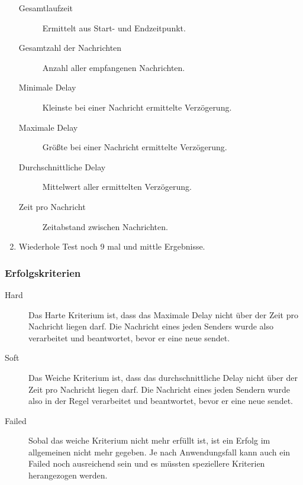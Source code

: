 \begin{enumerate}
  \begin{description}
  \item[Gesamtlaufzeit]
  Ermittelt aus Start- und Endzeitpunkt.
  
  \item[Gesamtzahl der Nachrichten]
  Anzahl aller empfangenen Nachrichten.
  
  \item[Minimale Delay]
  Kleinste bei einer Nachricht ermittelte Verzögerung.
  
  \item[Maximale Delay]
  Größte bei einer Nachricht ermittelte Verzögerung.
  
  \item[Durchschnittliche Delay]
  Mittelwert aller ermittelten Verzögerung.
  
  \item[Zeit pro Nachricht]
  Zeitabstand zwischen Nachrichten.
  \end{description}

\item
Wiederhole Test noch 9 mal und mittle Ergebnisse.
\end{enumerate}



\subsubsection{Erfolgskriterien}
\begin{description}
\item[Hard]
Das Harte Kriterium ist, dass das Maximale Delay nicht über der Zeit pro Nachricht liegen darf. Die Nachricht eines jeden Senders wurde also verarbeitet und beantwortet, bevor er eine neue sendet.

\item[Soft]
Das Weiche Kriterium ist, dass das durchschnittliche Delay nicht über der Zeit pro Nachricht liegen darf. Die Nachricht eines jeden Sendern wurde also in der Regel verarbeitet und beantwortet, bevor er eine neue sendet.

\item[Failed]
Sobal das weiche Kriterium nicht mehr erfüllt ist, ist ein Erfolg im allgemeinen nicht mehr gegeben. Je nach Anwendungsfall kann auch ein Failed noch ausreichend sein und es müssten speziellere Kriterien herangezogen werden.
\end{description}



